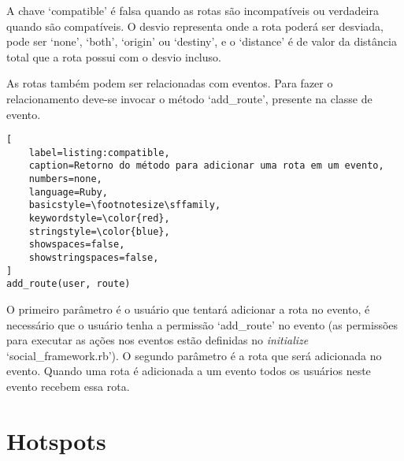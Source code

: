 A chave `compatible' é falsa quando as rotas são incompatíveis ou verdadeira quando são compatíveis. O desvio representa onde a rota poderá ser desviada, pode ser `none', `both', `origin' ou `destiny', e o `distance' é de valor da distância total que a rota possui com o desvio incluso.

As rotas também podem ser relacionadas com eventos. Para fazer o relacionamento deve-se invocar o método `add\_route', presente na classe de evento.

\begin{lstlisting}[
    label=listing:compatible,
    caption=Retorno do método para adicionar uma rota em um evento,
    numbers=none,
    language=Ruby,
    basicstyle=\footnotesize\sffamily,
    keywordstyle=\color{red},
    stringstyle=\color{blue},
    showspaces=false,
    showstringspaces=false,
]
add_route(user, route)
\end{lstlisting}

O primeiro parâmetro é o usuário que tentará adicionar a rota no evento, é necessário que o usuário tenha a permissão `add\_route' no evento (as permissões para executar as ações nos eventos estão definidas no \textit{initialize} `social\_framework.rb'). O segundo parâmetro é a rota que será adicionada no evento. Quando uma rota é adicionada a um evento todos os usuários neste evento recebem essa rota.

\section{Hotspots}